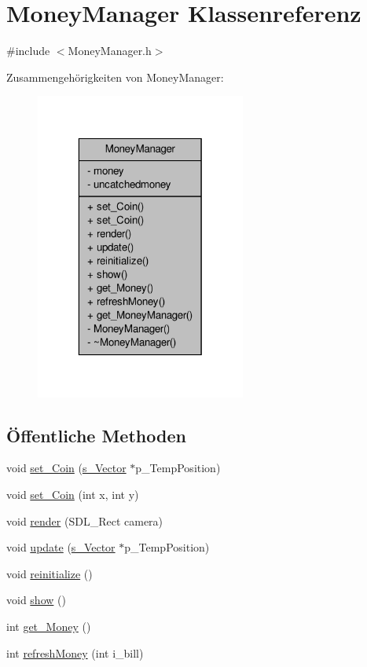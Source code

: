 \hypertarget{class_money_manager}{\section{Money\-Manager Klassenreferenz}
\label{class_money_manager}
}


{\ttfamily \#include $<$Money\-Manager.\-h$>$}



Zusammengehörigkeiten von Money\-Manager\-:
\nopagebreak
\begin{figure}[H]
\begin{center}
\leavevmode
\includegraphics[width=196pt]{class_money_manager__coll__graph}
\end{center}
\end{figure}
\subsection*{Öffentliche Methoden}
\begin{DoxyCompactItemize}
\item 
void \hyperlink{class_money_manager_afb4cbbd62d99a50349450f994180a030}{set\-\_\-\-Coin} (\hyperlink{structs___vector}{s\-\_\-\-Vector} $\ast$p\-\_\-\-Temp\-Position)
\item 
void \hyperlink{class_money_manager_af86f1a7b7224997f693dae28a2e3b025}{set\-\_\-\-Coin} (int x, int y)
\item 
void \hyperlink{class_money_manager_a33ad5f3a0229855b500ccbaf791d48db}{render} (S\-D\-L\-\_\-\-Rect camera)
\item 
void \hyperlink{class_money_manager_a2732c50d4ab200fa9aa89881ddaafe9b}{update} (\hyperlink{structs___vector}{s\-\_\-\-Vector} $\ast$p\-\_\-\-Temp\-Position)
\item 
void \hyperlink{class_money_manager_ad48afb7b433b15f01a554884a0b2e086}{reinitialize} ()
\item 
void \hyperlink{class_money_manager_acec03aacba984985299507968b60c40b}{show} ()
\item 
int \hyperlink{class_money_manager_a4ded1a440c3c30ab5f1ff498aa1f0caf}{get\-\_\-\-Money} ()
\item 
int \hyperlink{class_money_manager_acda99c2efae55a5c4eaf5670305d7f07}{refresh\-Money} (int i\-\_\-bill)
\end{DoxyCompactItemize}
